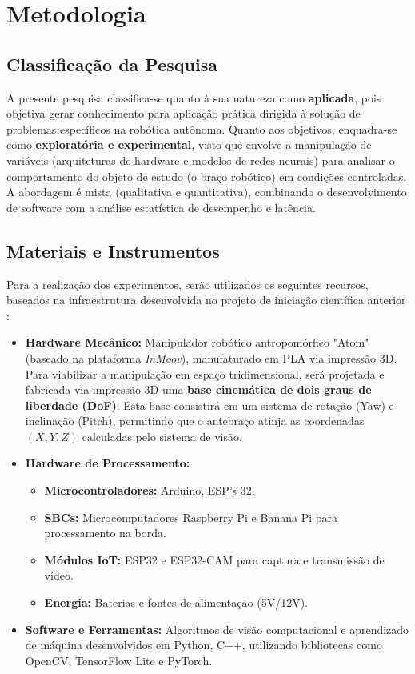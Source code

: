 \chapter*{Metodologia}

\section*{Classificação da Pesquisa}

A presente pesquisa classifica-se quanto à sua natureza como \textbf{aplicada}, pois objetiva gerar conhecimento para aplicação prática dirigida à solução de problemas específicos na robótica autônoma. Quanto aos objetivos, enquadra-se como \textbf{exploratória e experimental}, visto que envolve a manipulação de variáveis (arquiteturas de hardware e modelos de redes neurais) para analisar o comportamento do objeto de estudo (o braço robótico) em condições controladas. A abordagem é mista (qualitativa e quantitativa), combinando o desenvolvimento de software com a análise estatística de desempenho e latência.

\section*{Materiais e Instrumentos}

Para a realização dos experimentos, serão utilizados os seguintes recursos, baseados na infraestrutura desenvolvida no projeto de iniciação científica anterior :
\begin{itemize}
    \item \textbf{Hardware Mecânico:} Manipulador robótico antropomórfico "Atom" (baseado na plataforma \textit{InMoov}), manufaturado em PLA via impressão 3D. Para viabilizar a manipulação em espaço tridimensional, será projetada e fabricada via impressão 3D uma \textbf{base cinemática de dois graus de liberdade (DoF)}. Esta base consistirá em um sistema de rotação (Yaw) e inclinação (Pitch), permitindo que o antebraço atinja as coordenadas $(X, Y, Z)$ calculadas pelo sistema de visão.
    \item \textbf{Hardware de Processamento:}
    \begin{itemize}
        \item \textbf{Microcontroladores:} Arduino, ESP's 32.
        \item \textbf{SBCs:} Microcomputadores Raspberry Pi e Banana Pi para processamento na borda.
    \item \textbf{Módulos IoT:} ESP32 e ESP32-CAM para captura e transmissão de vídeo.
    \item \textbf{Energia:} Baterias e fontes de alimentação (5V/12V).
    \end{itemize}
    \item \textbf{Software e Ferramentas:} Algoritmos de visão computacional e aprendizado de máquina desenvolvidos em Python, C++, utilizando bibliotecas como OpenCV, TensorFlow Lite e PyTorch.
\end{itemize}

